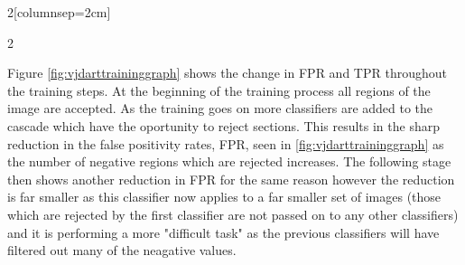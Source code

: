 \documentclass{article}
\begin{document}
\begin{multicols}{2}[columnsep=2cm]
\begin{multicols}{2}
{
  }
 

\end{multicols}
\label{fig:vjdarttraininggraph}

Figure \ref{fig:vjdarttraininggraph} shows the change in FPR and TPR throughout the
training steps. At the beginning of the training process all regions of the
image are accepted. As the training goes on more classifiers are added to the
cascade which have the oportunity to reject sections. This results in the sharp
reduction in the false positivity rates, FPR, seen in
\ref{fig:vjdarttraininggraph} as the number of negative regions which are
rejected increases. The following stage then shows another reduction in FPR for
the same reason however the reduction is far smaller as this classifier now
applies to a far smaller set of images (those which are rejected by the first
classifier are not passed on to any other classifiers) and it is performing a
more "difficult task" \cite{vj} as the previous classifiers will have filtered
out many of the neagative values.


\end{multicols}
\end{document}
